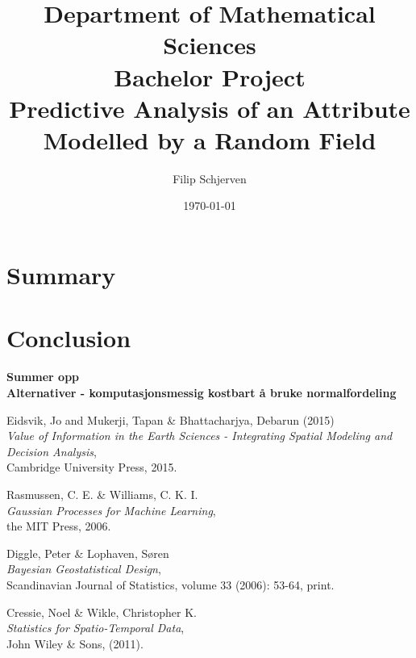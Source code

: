\documentclass[a4paper,11pt,titlepage]{article}
\title{Department of Mathematical Sciences \\
\vspace{0.5cm}
Bachelor Project \\
\vspace{1cm}
\Huge  Predictive Analysis of an Attribute Modelled by a Random Field %
}
\author{\Large Filip Schjerven}
\date{\Large \today}
\begin{document}
\maketitle

\newpage
\section*{Summary}
\newpage
{}
\tableofcontents
\listoffigures
{}
\newpage


\newpage

\newpage

\newpage

\newpage


\section{Conclusion}
\textbf{Summer opp} \\
\textbf{Alternativer - komputasjonsmessig kostbart å bruke normalfordeling} \\

\newpage
\begin{thebibliography}{9}

 Eidsvik, Jo and Mukerji, Tapan \& Bhattacharjya, Debarun (2015) \\ \emph{Value of Information in the Earth Sciences - Integrating Spatial Modeling and Decision Analysis}, \\ Cambridge University Press, 2015. 

 Rasmussen, C. E. \& Williams, C. K. I. \\ \emph{Gaussian Processes for Machine Learning}, \\ the MIT Press, 2006.

Diggle, Peter \& Lophaven, Søren \\ \emph{Bayesian Geostatistical Design}, \\ Scandinavian Journal of Statistics, volume 33 (2006): 53-64, print.

 Cressie, Noel \& Wikle, Christopher K. \\ \emph{Statistics for Spatio-Temporal Data}, \\ John Wiley \& Sons, (2011).


\end{thebibliography}
\end{document}
